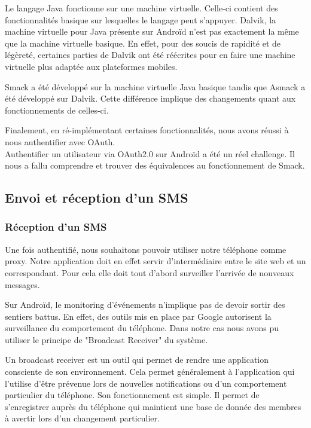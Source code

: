 Le langage Java fonctionne sur une machine virtuelle. Celle-ci contient des fonctionnalités basique sur
lesquelles le langage peut s'appuyer. Dalvik, la machine virtuelle pour Java présente sur Androïd n'est 
pas exactement la même que la machine virtuelle basique. En effet, pour des soucis de rapidité et de 
légèreté, certaines parties de Dalvik ont été réécrites pour en faire une machine virtuelle plus adaptée
aux plateformes mobiles.

Smack a été développé sur la machine virtuelle Java basique tandis que Asmack a été développé sur Dalvik.
Cette différence implique des changements quant aux fonctionnements de celles-ci. 

Finalement, en ré-implémentant certaines fonctionnalités, nous avons réussi à nous authentifier avec OAuth.
\\


Authentifier un utilisateur via OAuth2.0 sur Androïd a été un réel challenge. Il nous a fallu comprendre 
et trouver des équivalences au fonctionnement de Smack.



\subsection{Envoi et réception d'un SMS}

\subsubsection{Réception d'un SMS}

Une fois authentifié, nous souhaitons pouvoir utiliser notre téléphone comme proxy. Notre application
doit en effet servir d'intermédiaire entre le site web et un correspondant. Pour cela elle doit tout
d'abord surveiller l'arrivée de nouveaux messages. 
 
Sur Androïd, le monitoring d'événements n'implique pas de devoir sortir des sentiers battus. En effet,
des outils mis en place par Google autorisent la surveillance du comportement du téléphone. Dans notre cas 
nous avons pu utiliser le principe de "Broadcast Receiver" du système. 
 
Un broadcast receiver est un outil qui permet de rendre une application consciente de son environnement.
Cela permet généralement à l'application qui l'utilise d’être prévenue lors de nouvelles notifications ou 
d'un comportement particulier du téléphone.
Son fonctionnement est simple. Il permet de s'enregistrer auprès du téléphone qui maintient une base de donnée des 
membres à avertir lors d'un changement particulier.

